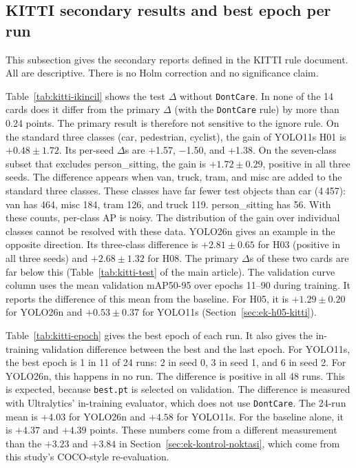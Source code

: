 \subsection{KITTI secondary results and best epoch per run}
This subsection gives the secondary reports defined in the KITTI rule document. All are descriptive. There is no Holm correction and no significance claim.



Table~\ref{tab:kitti-ikincil} shows the test $\Delta$ without \texttt{DontCare}. In none of the 14 cards does it differ from the primary $\Delta$ (with the \texttt{DontCare} rule) by more than 0.24 points. The primary result is therefore not sensitive to the ignore rule. On the standard three classes (car, pedestrian, cyclist), the gain of YOLO11s H01 is $+0.48\pm1.72$. Its per-seed $\Delta$s are +1.57, $-$1.50, and +1.38. On the seven-class subset that excludes person\_sitting, the gain is $+1.72\pm0.29$, positive in all three seeds. The difference appears when van, truck, tram, and misc are added to the standard three classes. These classes have far fewer test objects than car (4\,457): van has 464, misc 184, tram 126, and truck 119. person\_sitting has 56. With these counts, per-class AP is noisy. The distribution of the gain over individual classes cannot be resolved with these data. YOLO26n gives an example in the opposite direction. Its three-class difference is $+2.81\pm0.65$ for H03 (positive in all three seeds) and $+2.68\pm1.32$ for H08. The primary $\Delta$s of these two cards are far below this (Table~\ref{tab:kitti-test} of the main article). The validation curve column uses the mean validation mAP50-95 over epochs 11--90 during training. It reports the difference of this mean from the baseline. For H05, it is $+1.29\pm0.20$ for YOLO26n and $+0.53\pm0.37$ for YOLO11s (Section~\ref{sec:ek-h05-kitti}).



Table~\ref{tab:kitti-epoch} gives the best epoch of each run. It also gives the in-training validation difference between the best and the last epoch. For YOLO11s, the best epoch is 1 in 11 of 24 runs: 2 in seed 0, 3 in seed 1, and 6 in seed 2. For YOLO26n, this happens in no run. The difference is positive in all 48 runs. This is expected, because \texttt{best.pt} is selected on validation. The difference is measured with Ultralytics' in-training evaluator, which does not use \texttt{DontCare}. The 24-run mean is $+4.03$ for YOLO26n and $+4.58$ for YOLO11s. For the baseline alone, it is $+4.37$ and $+4.39$ points. These numbers come from a different measurement than the $+3.23$ and $+3.84$ in Section~\ref{sec:ek-kontrol-noktasi}, which come from this study's COCO-style re-evaluation.

